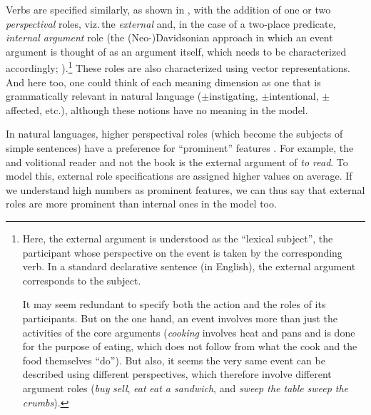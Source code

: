 \documentclass[output=paper]{LSP/langsci}
\begin{document}
Verbs are specified similarly, as shown in , with the addition of one or two \textit{perspectival} roles, viz.\,the \textit{external} and, in the case of a two-place predicate, \textit{internal argument} role (\cf the (Neo-)Davidsonian approach in which an event argument is thought of as an argument itself, which needs to be characterized accordingly; \citealt{Davidson2001Logical, Parsons1994Events}).\footnote{Here, the external argument is understood as the ``lexical subject'', \ie the participant whose perspective on the event is taken by the corresponding verb. In a standard declarative sentence (in English), the external argument corresponds to the subject. 

It may seem redundant to specify both the action and the roles of its participants. But on the one hand, an event involves more than just the activities of the core arguments (\eg \textit{cooking }involves heat and pans and is done for the purpose of eating, which does not follow from what the cook and the food themselves ``do''). But also, it seems the very same event can be described using different perspectives, which therefore involve different argument roles (\cf \textit{buy} \vs \textit{sell}, \textit{eat} \vs \textit{eat a sandwich}, and \textit{sweep the table} \vs \textit{sweep the crumbs}).\label{buy}} These roles are also characterized using vector representations. And here too, one could think of each meaning dimension as one that is grammatically relevant in natural language ($\pm$instigating, $\pm$intentional, $\pm$affected, etc.), although these notions have no meaning in the model. 

In natural languages, higher perspectival roles (which become the subjects of simple sentences) have a preference for ``prominent'' features \citep{Dowty1991Thematic, Primus1999Cases, Yipetal1987Case}. For example, the  and volitional reader and not the  book is the external argument of \textit{to read}. To model this, external role specifications are assigned higher values on average. If we understand high numbers as prominent features, we can thus say that external roles are more prominent than internal ones in the model too. 
\end{document}
